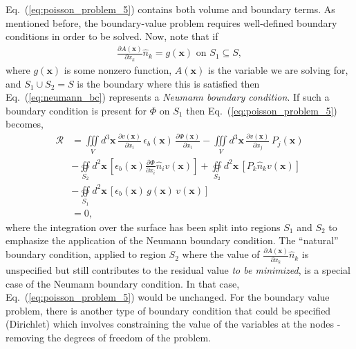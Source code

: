 \documentclass[22pt]{article} %
\begin{document}
%
Eq.~(\ref{eq:poisson_problem_5}) contains both volume and boundary terms.
%
As mentioned before, the boundary-value problem requires well-defined boundary conditions in order to be solved.
%
Now, note that if
%
\begin{align}\label{eq:neumann_bc}
\frac{\partial A(\textbf{x})}{\partial x_k} \hat{n}_k = g (\textbf{x})\,\,\mathrm{on}\,\, S_1 \subseteq S,
\end{align}
%
where $g(\textbf{x})$ is some nonzero function, $A(\textbf{x})$ is the variable we are solving for, and $S_1 \cup S_2 = S$ is the boundary where this is satisfied then Eq.~(\ref{eq:neumann_bc}) represents a \emph{Neumann boundary condition}.  
%
If such a boundary condition is present for $\Phi$ on $S_1$ then  Eq.~(\ref{eq:poisson_problem_5}) becomes,
%
\begin{align}\label{eq:poisson_problem_5_BC}
\mathscr{R} &= \iiint\limits_V d^3 \textbf{x} \, \frac{\partial v(\textbf{x})}{\partial x_i} \, \epsilon_b(\textbf{x}) \, \frac{\partial \Phi(\textbf{x})}{\partial x_i} - \iiint\limits_V d^3 \textbf{x} \, \frac{\partial v(\textbf{x})}{\partial x_j}\, P_j(\textbf{x}) \\ \nonumber
&- \oiint\limits_{S_2} d^2 \textbf{x} \, \left[\epsilon_b(\textbf{x}) \frac{\partial \Phi}{\partial x_i} \hat{n}_i v(\textbf{x})\right] + \oiint\limits_{S_2} d^2 \textbf{x} \, \left[ P_k \hat{n}_k v(\textbf{x})\right] \\ \nonumber
&- \oiint\limits_{S_1} d^2 \textbf{x} \, \left[\epsilon_b(\textbf{x}) \,g(\textbf{x})\, v(\textbf{x})\right] \\ \nonumber
&= 0,
\end{align}
%
where the integration over the surface has been split into regions $S_1$ and $S_2$ to emphasize the application of the Neumann boundary condition.
%
The ``natural'' boundary condition, applied to region $S_2$ where the value of $\frac{\partial A(\textbf{x})}{\partial x_k} \hat{n}_k $ is unspecified but still contributes to the residual value \emph{to be minimized}, is a special case of the Neumann boundary condition.
%
In that case, Eq.~(\ref{eq:poisson_problem_5}) would be unchanged.
%
For the boundary value problem, there is another type of boundary condition that could be specified (Dirichlet) which involves constraining the value of the variables at the nodes - removing the degrees of freedom of the problem. 
%
\end{document}
